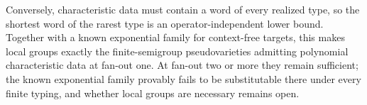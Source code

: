%
%


Conversely, characteristic data must contain a word of every realized
type, so the shortest word of the rarest type is an operator-independent
lower bound.  Together with a known exponential family for context-free
targets, this makes local groups exactly the finite-semigroup
pseudovarieties admitting polynomial characteristic data at fan-out one.  At fan-out two or more they remain sufficient; the
known exponential family provably fails to be substitutable there under
every finite typing, and whether local groups are necessary remains open.


